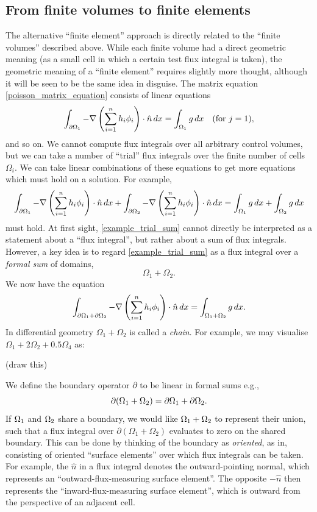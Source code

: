 \subsection{From finite volumes to finite elements}\label{trial_function}
The alternative ``finite element'' approach is directly related to the ``finite volumes'' described above. While each finite volume
had a direct geometric meaning (as a small cell in which a certain test flux integral is taken), the geometric meaning of a ``finite element''
requires slightly more thought, although it will be seen to be the same idea in disguise.
The matrix equation \eqref{poisson_matrix_equation} consists of linear equations
\begin{align*}
    \int_{{\partial\Omega}_1} -\nabla \left(\sum_{i=1}^n h_i\phi_i\right) \cdot \hat{n}\,dx
    =
    \int_{{\Omega}_1}g\,dx\quad\text{(for $j=1$)},
\end{align*}
and so on. We cannot compute flux integrals
over all arbitrary control volumes, but we can take a number of ``trial'' flux integrals over the finite number of cells $\Omega_i$.
We can take linear combinations of these equations to get more equations which must hold on a solution.
For example,
\begin{equation}\label{example_trial_sum}
    \int_{{\partial\Omega}_1} -\nabla \left(\sum_{i=1}^n h_i\phi_i\right) \cdot \hat{n}\,dx
    +
    \int_{{\partial\Omega}_2} -\nabla \left(\sum_{i=1}^n h_i\phi_i\right) \cdot \hat{n}\,dx
    =
    \int_{{\Omega}_1}g\,dx
    +
    \int_{{\Omega}_2}g\,dx
\end{equation}
must hold. At first sight, \eqref{example_trial_sum} cannot directly be interpreted as a statement about a ``flux integral'', but rather about a sum
of flux integrals. However, a key idea is to regard \eqref{example_trial_sum} as a flux integral over a \textit{formal sum} of domains,
    $$\Omega_1 + \Omega_2.$$
We now have the equation
\begin{equation}
    \int_{{\partial\Omega}_1 + {\partial\Omega}_2} -\nabla \left(\sum_{i=1}^n h_i\phi_i\right) \cdot \hat{n}\,dx
    =
    \int_{{\Omega}_1 + {\Omega}_2}g\,dx.
\end{equation}
In differential geometry $\Omega_1 + \Omega_2$ is called a \textit{chain}. For example, we may visualise $\Omega_1 + 2\Omega_2 + 0.5\Omega_4$ as:

\vskip 0.2in
(draw this)
\vskip 0.2in

We define the boundary operator $\partial$ to be linear in formal sums e.g.,
    $$\partial(\Omega_1 + \Omega_2) = {\partial\Omega}_1 + {\partial\Omega}_2.$$
If ${\Omega}_1$ and ${\Omega}_2$ share a boundary, we would like ${\Omega}_1 + {\Omega}_2$ to represent their union, such that a flux
integral over $\partial(\Omega_1 + \Omega_2)$ evaluates to zero on the shared boundary. This can be done by thinking of
the boundary as \textit{oriented}, as in, consisting of oriented ``surface elements'' over which flux integrals can be taken.
For example, the $\hat{n}$ in a flux integral denotes the outward-pointing normal, which represents an ``outward-flux-measuring surface element''.
The opposite $-\hat{n}$ then represents the ``inward-flux-measuring surface element'', which is outward from the perspective of an adjacent cell.

